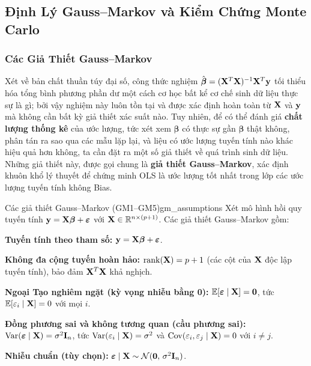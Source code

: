\subsection{Định Lý Gauss--Markov và Kiểm Chứng Monte Carlo}

\subsubsection{Các Giả Thiết Gauss--Markov}


Xét về bản chất thuần túy đại số, công thức nghiệm $\hat{\boldsymbol{\beta}} = (\mathbf{X}^T\mathbf{X})^{-1}\mathbf{X}^T\mathbf{y}$ tối thiểu hóa tổng bình phương phần dư một cách cơ học bất kể cơ chế sinh dữ liệu thực sự là gì; bởi vậy nghiệm này luôn tồn tại và được xác định hoàn toàn từ $\mathbf{X}$ và $\mathbf{y}$ mà không cần bất kỳ giả thiết xác suất nào. Tuy nhiên, để có thể đánh giá \textbf{chất lượng thống kê} của ước lượng, tức xét xem $\hat{\boldsymbol{\beta}}$ có thực sự gần $\boldsymbol{\beta}$ thật không, phân tán ra sao qua các mẫu lặp lại, và liệu có ước lượng tuyến tính nào khác hiệu quả hơn không, ta cần đặt ra một số giả thiết về quá trình sinh dữ liệu. Những giả thiết này, được gọi chung là \textbf{giả thiết Gauss--Markov}, xác định khuôn khổ lý thuyết để chứng minh OLS là ước lượng tốt nhất trong lớp các ước lượng tuyến tính không Bias.

\begin{mydef}{Các giả thiết Gauss--Markov (GM1--GM5)}{gm_assumptions}
Xét mô hình hồi quy tuyến tính $\mathbf{y} = \mathbf{X}\boldsymbol{\beta} + \boldsymbol{\varepsilon}$
với $\mathbf{X} \in \mathbb{R}^{n\times(p+1)}$. Các giả thiết Gauss--Markov gồm:
\begin{description}[leftmargin=1.4cm, style=nextline, font=\bfseries\color{primaryblue}]
    \item[GM1.] \textbf{Tuyến tính theo tham số:}
          $\mathbf{y} = \mathbf{X}\boldsymbol{\beta} + \boldsymbol{\varepsilon}$.
    \item[GM2.] \textbf{Không đa cộng tuyến hoàn hảo:}
          $\operatorname{rank}(\mathbf{X}) = p+1$ (các cột của $\mathbf{X}$ độc lập tuyến tính),
          bảo đảm $\mathbf{X}^T\mathbf{X}$ khả nghịch.
    \item[GM3.] \textbf{Ngoại Tạo nghiêm ngặt (kỳ vọng nhiễu bằng 0):}
          $\mathbb{E}[\boldsymbol{\varepsilon}\mid\mathbf{X}] = \mathbf{0}$,
          tức $\mathbb{E}[\varepsilon_i\mid\mathbf{X}] = 0$ với mọi $i$.
    \item[GM4.] \textbf{Đồng phương sai và không tương quan (cầu phương sai):}
          $\mathrm{Var}(\boldsymbol{\varepsilon}\mid\mathbf{X}) = \sigma^2\mathbf{I}_n$,
          tức $\mathrm{Var}(\varepsilon_i\mid\mathbf{X}) = \sigma^2$ và
          $\mathrm{Cov}(\varepsilon_i,\varepsilon_j\mid\mathbf{X}) = 0$ với $i\neq j$.
    \item[GM5.] \textbf{Nhiễu chuẩn (tùy chọn):}
          $\boldsymbol{\varepsilon}\mid\mathbf{X} \sim \mathcal{N}(\mathbf{0},\,\sigma^2\mathbf{I}_n)$.
\end{description}
\end{mydef}

